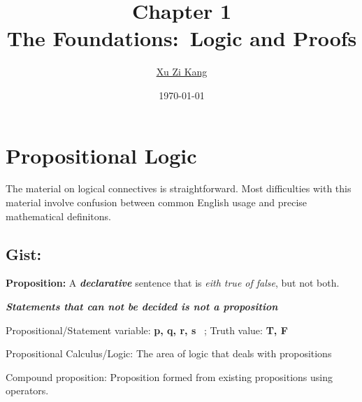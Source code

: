 \documentclass[none,green,normal,cn]{elegantnote}
\title{Chapter 1\\The Foundations:\ Logic and Proofs}
\author{\href{https://github.com/mrxgavin}{Xu Zi Kang}}
\date{\today}
\begin{document}
\maketitle

\section{Propositional Logic}
The material on logical connectives is straightforward. Most difficulties with this material involve confusion between common English usage and precise mathematical definitons.
\subsection{Gist:}
\textbf{Proposition:} A \emph{\textbf{declarative}} sentence that is \emph{eith true of false}, but not both.

\emph{\textbf{Statements that can not be decided is not a proposition}}

Propositional/Statement variable: \textbf{p, q, r, s} \ ; Truth value: \textbf{T, F}

Propositional Calculus/Logic: The area of logic that deals with propositions

Compound proposition: Proposition formed from existing propositions using operators.
\end{document}
